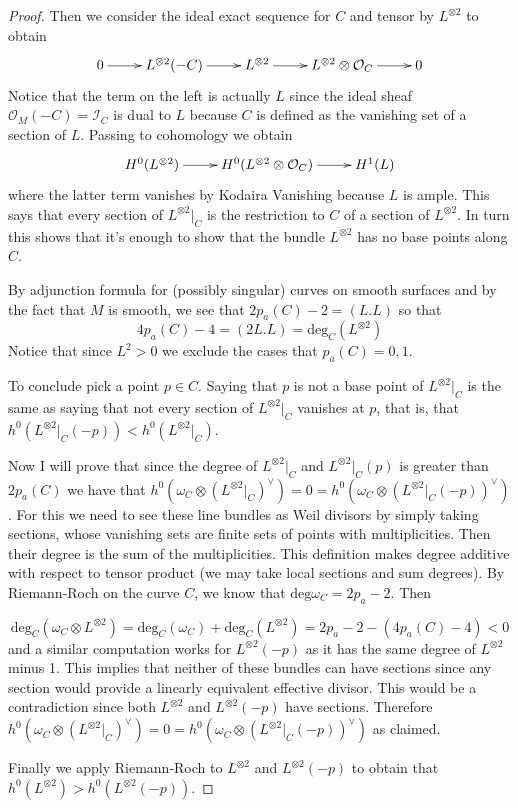 \begin{proof}
Then we consider the ideal exact sequence for $C$ and tensor by $L^{\otimes 2}$
to obtain
$$
\xymatrix{
0\ar[r]&L^{\otimes 2}(-C)\ar[r]&L^{\otimes 2}\ar[r]&
L^{\otimes 2}\otimes\mathcal{O}_C\ar[r]&0
}
$$
Notice that the term on the left is actually $L$ since the ideal sheaf
$\mathcal{O}_M(-C)=\mathcal{I}_C$ is dual to $L$ because $C$ is defined as the
vanishing set of a section of $L$. Passing to cohomology we obtain
 $$
\xymatrix{
H^{0}(L^{\otimes 2})\ar[r]&H^{0}(L^{\otimes 2}\otimes \mathcal{O}_C)\ar[r]&
H^{1}(L)
}
$$
where the latter term vanishes by Kodaira Vanishing because $L$ is ample.
This says that every section of $L^{\otimes 2}|_C$ is the
restriction to $C$ of a section of $L^{\otimes 2}$. In turn this shows that it's
enough to show that the bundle $L^{\otimes 2}$ has no base points along $C$.

By adjunction formula for (possibly singular) curves on smooth surfaces and by 
the fact that $M$ is smooth, we see that $2p_a(C)-2=(L.L)$ so that
$$
4p_a(C)-4=(2L.L)=\text{deg}_C(L^{\otimes 2})
$$
Notice that since $L^2>0$ we exclude the cases that $p_a(C)=0,1$.

To conclude pick a point $p\in C$. Saying that $p$ is not a base point of
$L^{\otimes 2}|_{C}$ is the same as saying that not every section of $L^{\otimes
2}|_{C}$ vanishes at $p$, that is, that 
$h^0(L^{\otimes 2}|_{C}(-p))<h^0(L^{\otimes 2}|_{C})$.

Now I will prove that since the degree of $L^{\otimes 2}|_{C}$ and $L^{\otimes
2}|_{C}(p)$ is greater than $2p_a(C)$ we have that 
$h^0(\omega_C\otimes (L^{\otimes2}|_{C})^\vee)=0
=h^0(\omega_C\otimes (L^{\otimes 2}|_{C}(-p))^\vee)$. For this we need to see these line
bundles as Weil divisors by simply taking sections, whose vanishing sets are 
finite sets of points with multiplicities. Then their degree is the sum of the
multiplicities.  This definition makes degree additive with respect to tensor
product (we may take local sections and sum degrees). By Riemann-Roch on the curve
$C$, we know that $\text{deg}\omega_C=2p_a-2$. Then

$$
\text{deg}_C(\omega_C\otimes L^{\otimes 2})
=\text{deg}_C(\omega_C)+\text{deg}_C(L^{\otimes 2})
=2p_a-2-(4p_a(C)-4)<0
$$
and a similar computation works for $L^{\otimes 2}(-p)$ as it has the same
degree of $L^{\otimes 2}$ minus 1. This implies that neither of these bundles
can have sections since any section would provide a linearly equivalent
effective divisor. This would be a contradiction since both
$L^{\otimes 2}$ and $L^{\otimes 2}(-p)$ have sections. Therefore 
$h^0(\omega_C\otimes (L^{\otimes2}|_{C})^\vee)=0
=h^0(\omega_C\otimes (L^{\otimes 2}|_{C}(-p))^\vee)$ as claimed.

Finally we apply Riemann-Roch to $L^{\otimes 2}$ and $L^{\otimes 2}(-p)$ to
obtain that $h^0(L^{\otimes 2})>h^0(L^{\otimes 2}(-p))$.
\end{proof}

